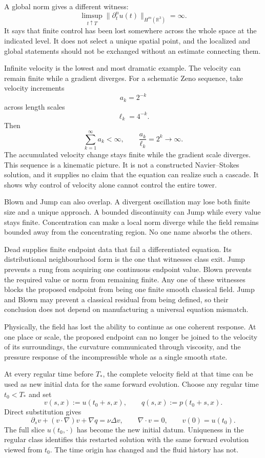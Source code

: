 A global norm gives a different witness:
\[
  \limsup_{t\uparrow T}
  \|\partial_t^n u(t)\|_{H^m(\mathbb R^3)}
  =
  \infty.
\]
It says that finite control has been lost somewhere across the whole space at the indicated level.
It does not select a unique spatial point, and the localized and global statements should not be exchanged without an estimate connecting them.

Infinite velocity is the lowest and most dramatic example.
The velocity can remain finite while a gradient diverges.
For a schematic Zeno sequence, take velocity increments
\[
  a_k=2^{-k}
\]
across length scales
\[
  \ell_k=4^{-k}.
\]
Then
\[
  \sum_{k=1}^{\infty}a_k<\infty,
  \qquad
  \frac{a_k}{\ell_k}=2^k\longrightarrow\infty.
\]
The accumulated velocity change stays finite while the gradient scale diverges.
This sequence is a kinematic picture.
It is not a constructed Navier--Stokes solution, and it supplies no claim that the equation can realize such a cascade.
It shows why control of velocity alone cannot control the entire tower.

Blown and Jump can also overlap.
A divergent oscillation may lose both finite size and a unique approach.
A bounded discontinuity can Jump while every value stays finite.
Concentration can make a local norm diverge while the field remains bounded away from the concentrating region.
No one name absorbs the others.

Dead supplies finite endpoint data that fail a differentiated equation.
Its distributional neighbourhood form is the one that witnesses class exit.
Jump prevents a rung from acquiring one continuous endpoint value.
Blown prevents the required value or norm from remaining finite.
Any one of these witnesses blocks the proposed endpoint from being one finite smooth classical field.
Jump and Blown may prevent a classical residual from being defined, so their conclusion does not depend on manufacturing a universal equation mismatch.

Physically, the field has lost the ability to continue as one coherent response.
At one place or scale, the proposed endpoint can no longer be joined to the velocity of its surroundings, the curvature communicated through viscosity, and the pressure response of the incompressible whole as a single smooth state.


At every regular time before \(T_*\), the complete velocity field at that time can be used as new initial data for the same forward evolution.
Choose any regular time \(t_0<T_*\) and set
\[
  v(s,x):=u(t_0+s,x),
  \qquad
  q(s,x):=p(t_0+s,x).
\]
Direct substitution gives
\[
  \partial_sv+(v\cdot\nabla)v+\nabla q
  =
  \nu\Delta v,
  \qquad
  \nabla\cdot v=0,
  \qquad
  v(0)=u(t_0).
\]
The full slice \(u(t_0,\cdot)\) has become the new initial datum.
Uniqueness in the regular class identifies this restarted solution with the same forward evolution viewed from \(t_0\).
The time origin has changed and the fluid history has not.

